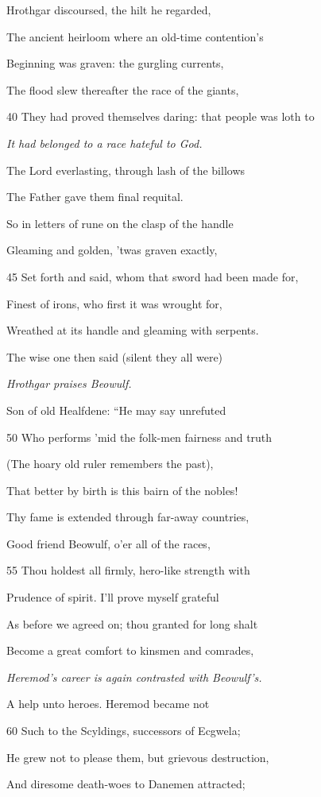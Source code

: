 Hrothgar discoursed, the hilt he regarded,

The ancient heirloom where an old-time contention’s

Beginning was graven: the gurgling currents,

The flood slew thereafter the race of the giants,

40
They had proved themselves daring: that people was loth to

\emph{It had belonged to
a race hateful to
God.}

The Lord everlasting, through lash of the billows

The Father gave them final requital.

So in letters of rune on the clasp of the handle

Gleaming and golden, ’twas graven exactly,

45
Set forth and said, whom that sword had been made for,

Finest of irons, who first it was wrought for,

Wreathed at its handle and gleaming with serpents.

The wise one then said (silent they all were)

\emph{Hrothgar praises
Beowulf.}

Son of old Healfdene: “He may say unrefuted

50
Who performs ’mid the folk-men fairness and truth

(The hoary old ruler remembers the past),

That better by birth is this bairn of the nobles!

Thy fame is extended through far-away countries,

Good friend Beowulf, o’er all of the races,

55
Thou holdest all firmly, hero-like strength with

Prudence of spirit. I’ll prove myself grateful

As before we agreed on; thou granted for long shalt

Become a great comfort to kinsmen and comrades,

\emph{Heremod’s career
is again contrasted
with Beowulf’s.}

A help unto heroes. Heremod became not

60
Such to the Scyldings, successors of Ecgwela;

He grew not to please them, but grievous destruction,

And diresome death-woes to Danemen attracted;

